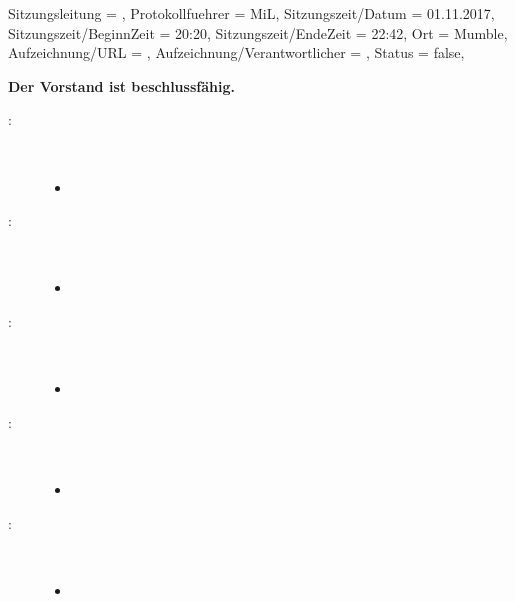 
\begin{Protokoll}{
		Sitzungsleitung                 = {}, 			%
		Protokollfuehrer                = {MiL},  			%
		Sitzungszeit/Datum              = {01.11.2017},   	%
		Sitzungszeit/BeginnZeit         = {20:20},			%
		Sitzungszeit/EndeZeit           = {22:42},			%
		Ort                             = {Mumble},			%
		Aufzeichnung/URL                = {},				%
		Aufzeichnung/Verantwortlicher   = {},		  	    %
		Status                          = {false},			%
	}
	
	\begin{Anwesenheitsliste}
	\end{Anwesenheitsliste}
	
	\textbf{Der Vorstand ist beschlussfähig.}
	
	
	
	\begin{description}
		\item[:] \     
		\begin{itemize}
			\item
		\end{itemize}
		\item[:] \     
		\begin{itemize}
			\item 
		\end{itemize}
		\item[:] \     
		\begin{itemize}
			\item 
		\end{itemize}
		\item[:] \     
		\begin{itemize}
			\item
		\end{itemize}
		\item[\getPersonAsWebsiteLink{FeW}:] \     
		\begin{itemize}
			\item 
		\end{itemize}
	\end{description}
	

\end{Protokoll}
